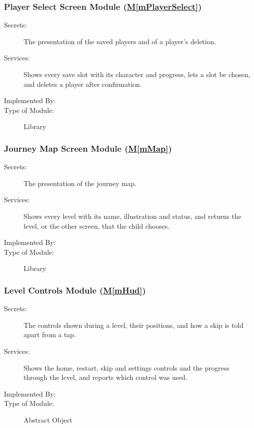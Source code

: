 \documentclass[12pt, titlepage]{article}
\newcommand{\mref}[1]{\hyperref[#1]{M\ref*{#1}}}
\begin{document}
\subsubsection{Player Select Screen Module (\mref{mPlayerSelect})}

\begin{description}
\item[Secrets:] The presentation of the saved players and of a player's
  deletion.
\item[Services:] Shows every save slot with its character and progress, lets a
  slot be chosen, and deletes a player after confirmation.
\item[Implemented By:] \progname{}
\item[Type of Module:] Library
\end{description}

\subsubsection{Journey Map Screen Module (\mref{mMap})}

\begin{description}
\item[Secrets:] The presentation of the journey map.
\item[Services:] Shows every level with its name, illustration and status, and
  returns the level, or the other screen, that the child chooses.
\item[Implemented By:] \progname{}
\item[Type of Module:] Library
\end{description}

\subsubsection{Level Controls Module (\mref{mHud})}

\begin{description}
\item[Secrets:] The controls shown during a level, their positions, and how a
  skip is told apart from a tap.
\item[Services:] Shows the home, restart, skip and settings controls and the
  progress through the level, and reports which control was used.
\item[Implemented By:] \progname{}
\item[Type of Module:] Abstract Object
\end{description}
\end{document}
